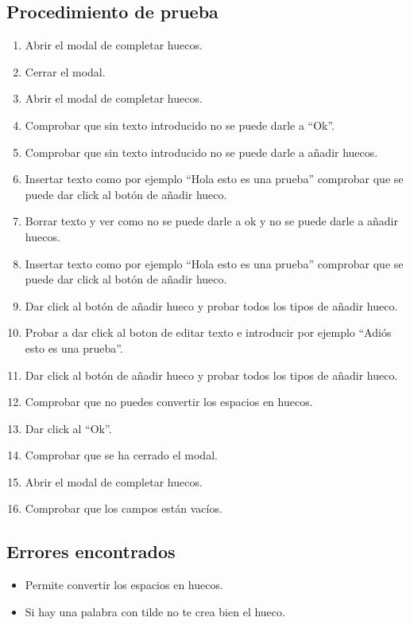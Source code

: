 \subsection{Procedimiento de prueba}
\label{procedimientoPruebas:huecos}
\begin{enumerate}
    \item Abrir el modal de completar huecos.
    \item Cerrar el modal.
    \item Abrir el modal de completar huecos.
    \item Comprobar que sin texto introducido no se puede darle a ``Ok''.
    \item Comprobar que sin texto introducido no se puede darle a añadir huecos.
    \item Insertar texto como por ejemplo ``Hola esto es una prueba'' comprobar que se puede dar click al botón de añadir hueco.
    \item Borrar texto y ver como no se puede darle a ok y no se puede darle a añadir huecos.
    \item Insertar texto como por ejemplo ``Hola esto es una prueba'' comprobar que se puede dar click al botón de añadir hueco.
    \item Dar click al botón de añadir hueco y probar todos los tipos de añadir hueco.
    \item Probar a dar click al boton de editar texto e introducir por ejemplo ``Adiós esto es una prueba''.
    \item Dar click al botón de añadir hueco y probar todos los tipos de añadir hueco.
    \item Comprobar que no puedes convertir los espacios en huecos.
    \item Dar click al ``Ok''.
    \item Comprobar que se ha cerrado el modal.
    \item Abrir el modal de completar huecos.
    \item Comprobar que los campos están vacíos.
\end{enumerate}

\subsection{Errores encontrados}
\label{errores:huecos}
\begin{itemize}
    \item Permite convertir los espacios en huecos.
    \item Si hay una palabra con tilde no te crea bien el hueco.
\end{itemize}


